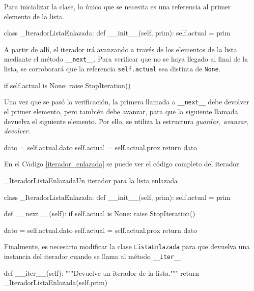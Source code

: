 Para inicializar la clase, lo único que se necesita es una referencia al
primer elemento de la lista.

\begin{codigo-python-sn}
class _IteradorListaEnlazada:
    def __init__(self, prim):
        self.actual = prim
\end{codigo-python-sn}

A partir de allí, el iterador irá avanzando a través de los elementos de la
lista mediante el método \lstinline!__next__!.  Para verificar que no se haya
llegado al final de la lista, se corroborará que la referencia
\lstinline!self.actual! sea distinta de \lstinline!None!.

\begin{codigo-python-sn}
if self.actual is None:
    raise StopIteration()
\end{codigo-python-sn}

Una vez que se pasó la verificación, la primera llamada a \lstinline!__next__!
debe devolver el primer elemento, pero también debe avanzar, para que la
siguiente llamada devuelva el siguiente elemento.  Por ello, se utiliza la
estructura {\it guardar, avanzar, devolver}.

\begin{codigo-python-sn}
dato = self.actual.dato
self.actual = self.actual.prox
return dato
\end{codigo-python-sn}

En el Código \ref{iterador_enlazada} se puede ver el código completo del
iterador.

\begin{codigo}{\_IteradorListaEnlazada}{Un iterador para la lista enlazada}
\label{iterador_enlazada}
\begin{codigo-python}
class _IteradorListaEnlazada:
    def __init__(self, prim):
        self.actual = prim

    def __next__(self):
        if self.actual is None:
            raise StopIteration()

        dato = self.actual.dato
        self.actual = self.actual.prox
        return dato
\end{codigo-python}
\end{codigo}

Finalmente, es necesario modificar la clase \lstinline!ListaEnlazada! para que
devuelva una instancia del iterador
cuando se llama al método \lstinline!__iter__!.

\begin{codigo-python-sn}
    def __iter__(self):
        """Devuelve un iterador de la lista."""
        return _IteradorListaEnlazada(self.prim)
\end{codigo-python-sn}

